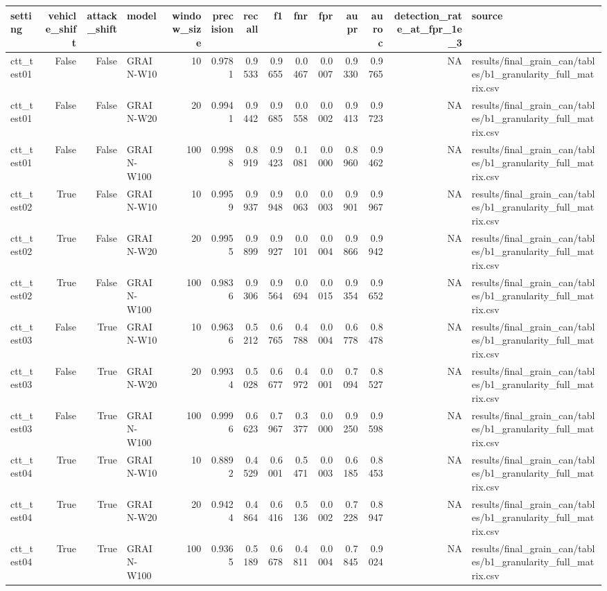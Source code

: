 \begin{tabular}{lrrlrrrrrrrrrl}
\toprule
setting & vehicle\_shift & attack\_shift & model & window\_size & precision & recall & f1 & fnr & fpr & aupr & auroc & detection\_rate\_at\_fpr\_1e\_3 & source \\
\midrule
ctt\_test01 & False & False & GRAIN-W10 & 10 & 0.9781 & 0.9533 & 0.9655 & 0.0467 & 0.0007 & 0.9330 & 0.9765 & NA & results/final\_grain\_can/tables/b1\_granularity\_full\_matrix.csv \\
ctt\_test01 & False & False & GRAIN-W20 & 20 & 0.9941 & 0.9442 & 0.9685 & 0.0558 & 0.0002 & 0.9413 & 0.9723 & NA & results/final\_grain\_can/tables/b1\_granularity\_full\_matrix.csv \\
ctt\_test01 & False & False & GRAIN-W100 & 100 & 0.9988 & 0.8919 & 0.9423 & 0.1081 & 0.0000 & 0.8960 & 0.9462 & NA & results/final\_grain\_can/tables/b1\_granularity\_full\_matrix.csv \\
ctt\_test02 & True & False & GRAIN-W10 & 10 & 0.9959 & 0.9937 & 0.9948 & 0.0063 & 0.0003 & 0.9901 & 0.9967 & NA & results/final\_grain\_can/tables/b1\_granularity\_full\_matrix.csv \\
ctt\_test02 & True & False & GRAIN-W20 & 20 & 0.9955 & 0.9899 & 0.9927 & 0.0101 & 0.0004 & 0.9866 & 0.9942 & NA & results/final\_grain\_can/tables/b1\_granularity\_full\_matrix.csv \\
ctt\_test02 & True & False & GRAIN-W100 & 100 & 0.9836 & 0.9306 & 0.9564 & 0.0694 & 0.0015 & 0.9354 & 0.9652 & NA & results/final\_grain\_can/tables/b1\_granularity\_full\_matrix.csv \\
ctt\_test03 & False & True & GRAIN-W10 & 10 & 0.9636 & 0.5212 & 0.6765 & 0.4788 & 0.0004 & 0.6778 & 0.8478 & NA & results/final\_grain\_can/tables/b1\_granularity\_full\_matrix.csv \\
ctt\_test03 & False & True & GRAIN-W20 & 20 & 0.9934 & 0.5028 & 0.6677 & 0.4972 & 0.0001 & 0.7094 & 0.8527 & NA & results/final\_grain\_can/tables/b1\_granularity\_full\_matrix.csv \\
ctt\_test03 & False & True & GRAIN-W100 & 100 & 0.9996 & 0.6623 & 0.7967 & 0.3377 & 0.0000 & 0.9250 & 0.9598 & NA & results/final\_grain\_can/tables/b1\_granularity\_full\_matrix.csv \\
ctt\_test04 & True & True & GRAIN-W10 & 10 & 0.8892 & 0.4529 & 0.6001 & 0.5471 & 0.0003 & 0.6185 & 0.8453 & NA & results/final\_grain\_can/tables/b1\_granularity\_full\_matrix.csv \\
ctt\_test04 & True & True & GRAIN-W20 & 20 & 0.9424 & 0.4864 & 0.6416 & 0.5136 & 0.0002 & 0.7228 & 0.8947 & NA & results/final\_grain\_can/tables/b1\_granularity\_full\_matrix.csv \\
ctt\_test04 & True & True & GRAIN-W100 & 100 & 0.9365 & 0.5189 & 0.6678 & 0.4811 & 0.0004 & 0.7845 & 0.9024 & NA & results/final\_grain\_can/tables/b1\_granularity\_full\_matrix.csv \\
\bottomrule
\end{tabular}
